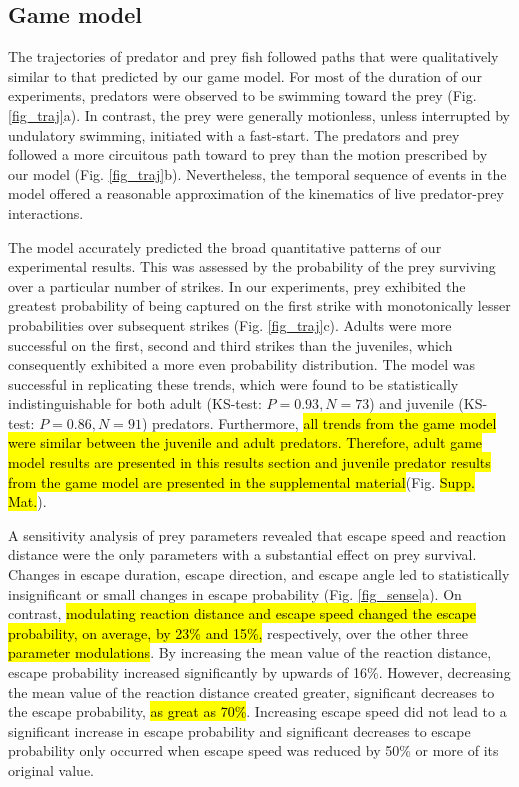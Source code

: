 \documentclass[]{rsos}%
\begin{document}
\subsection{Game model} %
The trajectories of predator and prey fish followed paths that were qualitatively similar to that predicted by our game model.
For most of the duration of our experiments, predators were observed to be swimming toward the prey (Fig. \ref{fig_traj}a). 
In contrast, the prey were generally motionless, unless interrupted by undulatory swimming, initiated with a fast-start.
The predators and prey followed a more circuitous path toward to prey than the motion prescribed by our model (Fig. \ref{fig_traj}b).
Nevertheless, the temporal sequence of events in the model offered a reasonable approximation of the kinematics of live predator-prey interactions.

The model accurately predicted the broad quantitative patterns of our experimental results.
This was assessed by the probability of the prey surviving over a particular number of strikes. 
In our experiments, prey exhibited the greatest probability of being captured on the first strike with monotonically lesser probabilities over subsequent strikes (Fig. \ref{fig_traj}c).
Adults were more successful on the first, second and third strikes than the juveniles, which consequently exhibited a more even probability distribution.
The model was successful in replicating these trends, which were found to be statistically indistinguishable for both adult (KS-test: $P = 0.93, N = 73$) and juvenile (KS-test: $P = 0.86, N = 91$) predators. 
Furthermore, \hl{all trends from the game model were similar between the juvenile and adult predators. Therefore, adult game model results are presented in this results section and juvenile predator results from the game model are presented in the supplemental material}(Fig. \hl{Supp. Mat.}).


A sensitivity analysis of prey parameters revealed that escape speed and reaction distance were the only parameters with a substantial effect on prey survival. 
Changes in escape duration, escape direction, and escape angle led to statistically insignificant or small changes in escape probability (Fig. \ref{fig_sense}a). 
On contrast, \hl{modulating reaction distance and escape speed changed the escape probability, on average, by 23\% and 15\%,} respectively, over the other three \hl{parameter modulations}.
By increasing the mean value of the reaction distance, escape probability increased significantly by upwards of 16\%. 
However, decreasing the mean value of the reaction distance created greater, significant decreases to the escape probability, \hl{as great as 70\%}. 
Increasing escape speed did not lead to a significant increase in escape probability and significant decreases to escape probability only occurred when escape speed was reduced by 50\% or more of its original value.
\end{document}
